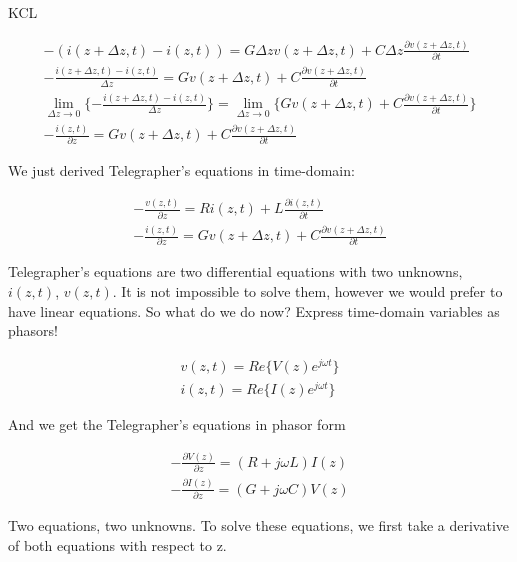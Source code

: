 \documentclass{ximera}
\begin{document}
KCL

\begin{eqnarray}
-( i(z+ \Delta z ,t)- i(z,t))= G \Delta z v(z+\Delta z,t)+C\Delta z
\frac{\partial v(z+\Delta z,t)}{\partial t} \label{te1kc11} \\
-\frac{ i(z+ \Delta z ,t)- i(z,t)}{\Delta z}= G v(z+\Delta z,t)+C
\frac{\partial v(z+\Delta z,t)}{\partial t} \label{te1kc21} \\
\lim_{\Delta z \to 0} \{-\frac{ i(z+ \Delta z ,t)- i(z,t)}{\Delta z} \}= \lim_{\Delta z \to 0} \{ G v(z+\Delta z,t)+C
\frac{\partial v(z+\Delta z,t)}{\partial t} \} \label{te1kc211} \\
-\frac{i(z,t) }{\partial z}= G v(z+\Delta z,t)+C
\frac{\partial v(z+\Delta z,t)}{\partial t} \label{te1kc31}
\end{eqnarray}



We just derived Telegrapher's equations in time-domain:



\begin{eqnarray}
-\frac{v(z,t) }{\partial z}=R i(z,t)+L 
 \frac{\partial i(z,t)}{\partial t} \nonumber  \\ \nonumber
-\frac{i(z,t) }{\partial z}= G v(z+\Delta z,t)+C
\frac{\partial v(z+\Delta z,t)}{\partial t} 
\end{eqnarray}


Telegrapher's equations are two differential equations with two unknowns, $i(z, t)$, $v(z, t)$. It is not
impossible to solve them, however we would prefer to have linear 
equations. So what do we do now?
Express time-domain variables as phasors!

\begin{eqnarray}
v(z,t)=Re\{ V(z) e^{j \omega t} \} \nonumber \\
i(z,t)=Re\{ I(z) e^{j \omega t} \} \nonumber
\end{eqnarray}

And we get the Telegrapher's equations in phasor form


\begin{eqnarray}
-\frac{\partial V(z)}{\partial z} = (R+j\omega L) I(z) \label{te11}\\
-\frac{\partial I(z)}{\partial z} = (G+j\omega C) V(z) \label{te121}
\end{eqnarray}



Two equations, two unknowns. To solve these equations, we first
take a derivative of  both equations with respect to  z. 
\end{document}
